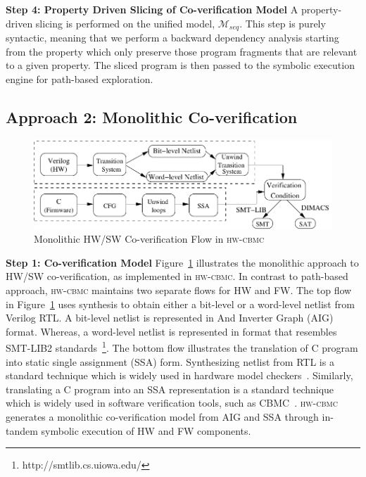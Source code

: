\documentclass[sigconf]{acmart}
\newcommand{\tool}[1]{\textsc{#1}\xspace}
\newcommand{\hwcbmcv}{\tool{hw-cbmc}}
\newcommand{\verifox}{\tool{CoVerIf}}
\begin{document}
\textbf{Step 4: Property Driven Slicing of Co-verification Model}
A property-driven slicing is performed on the unified model, $\mathcal{M}_{seq}$.  
This step is purely syntactic, meaning that we perform a backward dependency 
analysis starting from the property which only preserve those 
program fragments that are relevant to a given property. The sliced program 
is then passed to the symbolic execution engine for path-based exploration. \\
%

%
\subsection{Approach 2: Monolithic Co-verification}
%
\begin{figure}[t]
\begin{center}
\includegraphics[scale=0.6]{figures/traditional_flow.pdf}
\caption{\small Monolithic HW/SW Co-verification Flow in \hwcbmcv}
\label{fig:conventional}
\end{center}
\end{figure}
%
\textbf{Step 1: Co-verification Model}
%
Figure~\ref{fig:conventional} illustrates the monolithic approach to HW/SW
co-veri\-fi\-cation, as implemented in \hwcbmcv.  
In contrast to path-based approach,
\hwcbmcv maintains two separate flows for HW and FW.  The top flow in
Figure~\ref{fig:conventional} uses synthesis to obtain either a bit-level or
a word-level netlist from Verilog RTL.  A bit-level netlist is represented 
in And Inverter Graph (AIG) format.  Whereas, a word-level netlist is represented 
in format that resembles SMT-LIB2 standards~\footnote{http://smtlib.cs.uiowa.edu/}.  
The bottom flow illustrates the translation of C program 
into static single assignment (SSA) form. 
Synthesizing netlist from RTL is a standard technique which is widely 
used in hardware model checkers~\cite{DBLP:journals/tse/Clarke76}.
Similarly, translating a C program into an SSA representation is a 
standard technique which is widely used in 
software verification tools, such as CBMC~\cite{cbmc.tacas:2004}. 
\hwcbmcv generates a monolithic co-verification model from AIG and SSA through 
in-tandem symbolic execution of HW and FW components.  
\end{document}
